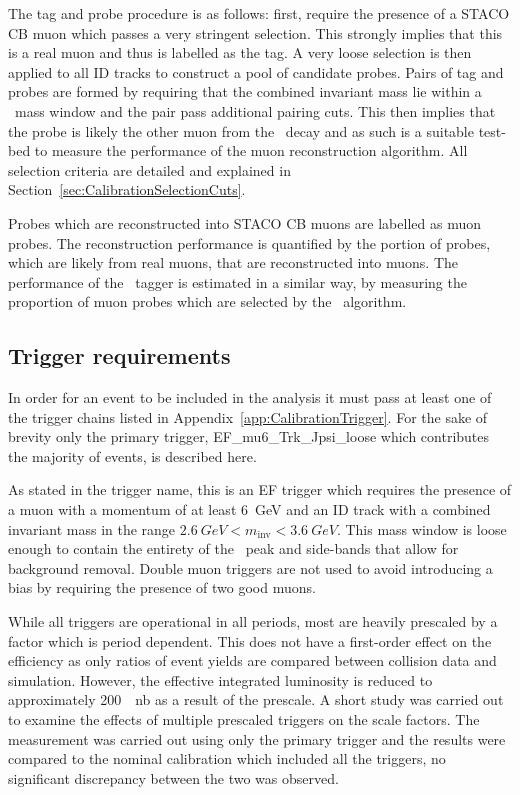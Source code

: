 The tag and probe procedure is as follows: first, require the presence of a STACO CB muon which passes a very stringent selection. This strongly implies that this is a real muon and thus is labelled as the tag. A very loose selection is then applied to all ID tracks to construct a pool of candidate probes. Pairs of tag and probes are formed by requiring that the combined invariant mass lie within a \jpsi\ mass window and the pair pass additional pairing cuts. This then implies that the probe is likely the other muon from the \jpsi\ decay and as such is a suitable test-bed to measure the performance of the muon reconstruction algorithm. All selection criteria are detailed and explained in Section~\ref{sec:CalibrationSelectionCuts}.

Probes which are reconstructed into STACO CB muons are labelled as muon probes. The reconstruction performance is quantified by the portion of probes, which are likely from real muons, that are reconstructed into muons. The performance of the \xsm\ tagger is estimated in a similar way, by measuring the proportion of muon probes which are selected by the \xsm\ algorithm.

\subsection{Trigger requirements} \label{sec:CalibrationTriggerRequirement}

In order for an event to be included in the analysis it must pass at least one of the trigger chains listed in Appendix~\ref{app:CalibrationTrigger}. For the sake of brevity only the primary trigger, EF\_mu6\_Trk\_Jpsi\_loose which contributes the majority of events, is described here.

As stated in the trigger name, this is an EF trigger which requires the presence of a muon with a momentum of at least \SI{6}{GeV} and an ID track with a combined invariant mass in the range $\SI{2.6}{GeV}<m_{\textrm{inv}}<\SI{3.6}{GeV}$. This mass window is loose enough to   contain the entirety of the \jpsi\ peak and side-bands that allow for background removal. Double muon triggers are not used to avoid introducing a bias by requiring the presence of two good muons. 

While all triggers are operational in all periods, most are heavily prescaled by a factor which is period dependent. This does not have a first-order effect on the efficiency as only ratios of event yields are compared between collision data and simulation. However, the effective integrated luminosity is reduced to approximately \SI{200}{\per\nano\barn} as a result of the prescale. A short study was carried out to examine the effects of multiple prescaled triggers on the scale factors. The measurement was carried out using only the primary trigger and the results were compared to the nominal calibration which included all the triggers, no significant discrepancy between the two was observed.


